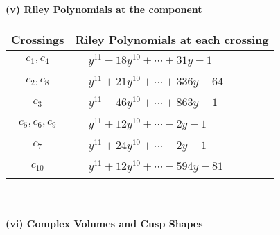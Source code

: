\documentclass[1p]{elsarticle_modified}
\theoremstyle{definition}
\begin{document}
\newpage\renewcommand{\arraystretch}{1}
\flushleft \textbf{(v) Riley Polynomials at the component}\newline \\
\begin{tabular}{m{50pt}|m{274pt}}
Crossings & \hspace{64pt}Riley Polynomials at each crossing \\
\hline $$\begin{aligned}c_{1},c_{4}\end{aligned}$$&$\begin{aligned}
&y^{11}-18 y^{10}+\cdots+31 y-1
\end{aligned}$\\
\hline $$\begin{aligned}c_{2},c_{8}\end{aligned}$$&$\begin{aligned}
&y^{11}+21 y^{10}+\cdots+336 y-64
\end{aligned}$\\
\hline $$\begin{aligned}c_{3}\end{aligned}$$&$\begin{aligned}
&y^{11}-46 y^{10}+\cdots+863 y-1
\end{aligned}$\\
\hline $$\begin{aligned}c_{5},c_{6},c_{9}\end{aligned}$$&$\begin{aligned}
&y^{11}+12 y^{10}+\cdots-2 y-1
\end{aligned}$\\
\hline $$\begin{aligned}c_{7}\end{aligned}$$&$\begin{aligned}
&y^{11}+24 y^{10}+\cdots-2 y-1
\end{aligned}$\\
\hline $$\begin{aligned}c_{10}\end{aligned}$$&$\begin{aligned}
&y^{11}+12 y^{10}+\cdots-594 y-81
\end{aligned}$\\
\hline
\end{tabular}\\~\\
\newpage\flushleft \textbf{(vi) Complex Volumes and Cusp Shapes}
\end{document}
